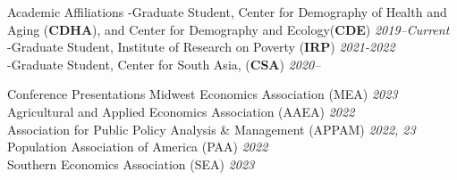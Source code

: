 \documentclass{resume} %
\begin{document}
\begin{rSection}{Academic Affiliations}
-Graduate Student, Center for Demography of Health and Aging (\textbf{CDHA}), and Center for Demography and Ecology(\textbf{CDE})
 \hfill \textit{2019--Current}\\
-Graduate Student, Institute of Research on Poverty (\textbf{IRP})%
 \hfill \textit{2021-2022}\\
 -Graduate Student, Center for South Asia, (\textbf{CSA})%
 \hfill \textit{2020--}
\end{rSection}




\begin{rSection}{Conference Presentations} 
	Midwest Economics Association (MEA) {\hfill \em 2023}\\
	Agricultural and Applied Economics Association (AAEA) {\hfill \em 2022}\\
	Association for Public Policy Analysis \& Management (APPAM) {\hfill \em 2022, 23} \\
	Population Association of America (PAA) {\hfill \em 2022} \\
	Southern Economics Association (SEA) {\hfill \em 2023} 





	
	
	
	
	
	
\end{rSection}
	
\end{document}

